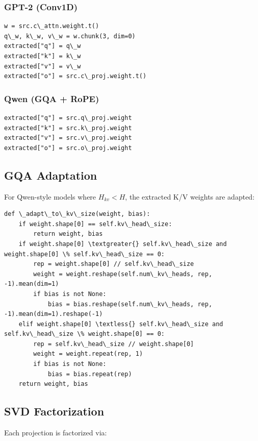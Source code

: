 \subsubsection{GPT-2 (Conv1D)}

\begin{lstlisting}
w = src.c\_attn.weight.t()
q\_w, k\_w, v\_w = w.chunk(3, dim=0)
extracted["q"] = q\_w
extracted["k"] = k\_w
extracted["v"] = v\_w
extracted["o"] = src.c\_proj.weight.t()
\end{lstlisting}

\subsubsection{Qwen (GQA + RoPE)}

\begin{lstlisting}
extracted["q"] = src.q\_proj.weight
extracted["k"] = src.k\_proj.weight
extracted["v"] = src.v\_proj.weight
extracted["o"] = src.o\_proj.weight
\end{lstlisting}

\subsection{GQA Adaptation}

For Qwen-style models where $H_{kv} < H$, the extracted K/V weights are 
adapted:

\begin{lstlisting}
def \_adapt\_to\_kv\_size(weight, bias):
    if weight.shape[0] == self.kv\_head\_size:
        return weight, bias
    if weight.shape[0] \textgreater{} self.kv\_head\_size and weight.shape[0] \% self.kv\_head\_size == 0:
        rep = weight.shape[0] // self.kv\_head\_size
        weight = weight.reshape(self.num\_kv\_heads, rep, -1).mean(dim=1)
        if bias is not None:
            bias = bias.reshape(self.num\_kv\_heads, rep, -1).mean(dim=1).reshape(-1)
    elif weight.shape[0] \textless{} self.kv\_head\_size and self.kv\_head\_size \% weight.shape[0] == 0:
        rep = self.kv\_head\_size // weight.shape[0]
        weight = weight.repeat(rep, 1)
        if bias is not None:
            bias = bias.repeat(rep)
    return weight, bias
\end{lstlisting}

\subsection{SVD Factorization}

Each projection is factorized via:

